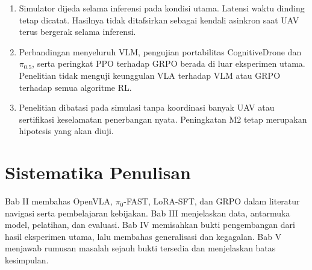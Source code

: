 \begin{enumerate}
    \item Simulator dijeda selama inferensi pada kondisi utama. Latensi waktu dinding tetap dicatat. Hasilnya tidak ditafsirkan sebagai kendali asinkron saat UAV terus bergerak selama inferensi.
    \item Perbandingan menyeluruh VLM, pengujian portabilitas CognitiveDrone dan $\pi_{0.5}$, serta peringkat PPO terhadap GRPO berada di luar eksperimen utama. Penelitian tidak menguji keunggulan VLA terhadap VLM atau GRPO terhadap semua algoritme RL.
    \item Penelitian dibatasi pada simulasi tanpa koordinasi banyak UAV atau sertifikasi keselamatan penerbangan nyata. Peningkatan M2 tetap merupakan hipotesis yang akan diuji.
\end{enumerate}

\section{Sistematika Penulisan}
\label{sec:sistematika}
Bab II membahas OpenVLA, $\pi_0$-FAST, LoRA-SFT, dan GRPO dalam literatur navigasi serta pembelajaran kebijakan. Bab III menjelaskan data, antarmuka model, pelatihan, dan evaluasi. Bab IV memisahkan bukti pengembangan dari hasil eksperimen utama, lalu membahas generalisasi dan kegagalan. Bab V menjawab rumusan masalah sejauh bukti tersedia dan menjelaskan batas kesimpulan.
